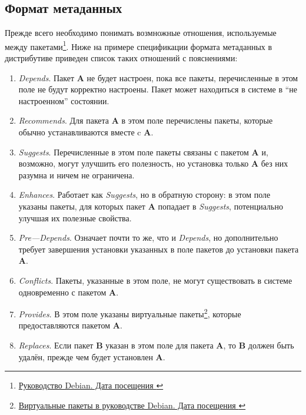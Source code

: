 \subsection{Формат метаданных}
Прежде всего необходимо понимать возмножные отношения, используемые между пакетами\footnote{\href{https://www.debian.org/doc/debian-policy/ch-relationships.html}{Руководство Debian. Дата посещения }}.
Ниже на примере спецификации формата метаданных в дистрибутиве {\debian} приведен список таких отношений с пояснениями:
\begin{enumerate}
	\item \textit{Depends}.\newline
	      Пакет \textbf{A} не будет настроен, пока все пакеты, перечисленные в этом поле не будут корректно настроены. Пакет может находиться в системе в ``не настроенном'' состоянии.
	\item \textit{Recommends}.\newline
	      Для пакета \textbf{A} в этом поле перечислены пакеты, которые обычно устанавливаются вместе c \textbf{A}.
	\item \textit{Suggests}.\newline
	      Перечисленные в этом поле пакеты связаны с пакетом \textbf{A} и, возможно, могут улучшить его полезность, но установка только \textbf{A} без них разумна и ничем не ограничена.
	\item \textit{Enhances}.\newline
	      Работает как \textit{Suggests}, но в обратную сторону: в этом поле указаны пакеты, для которых пакет \textbf{A} попадает в \textit{Suggests}, потенциально улучшая их полезные свойства.
	\item \textit{Pre---Depends}.\newline
	      Означает почти то же, что и \textit{Depends}, но дополнительно требует завершения установки указанных в поле пакетов до установки пакета \textbf{A}.
	\item \textit{Conflicts}.\newline
	      Пакеты, указанные в этом поле, не могут существовать в системе одновременно с пакетом \textbf{A}.
	\item \textit{Provides}.\newline
	      В этом поле указаны виртуальные пакеты\footnote{\href{https://www.debian.org/doc/debian-policy/ch-binary.html\#s-virtual-pkg}{Виртуальные пакеты в руководстве Debian. Дата посещения }}, которые предоставляются пакетом \textbf{A}.
	\item \textit{Replaces}.\newline
	      Если пакет \textbf{B} указан в этом поле для пакета \textbf{A}, то \textbf{B} должен быть удалён, прежде чем будет установлен \textbf{A}.
\end{enumerate}

